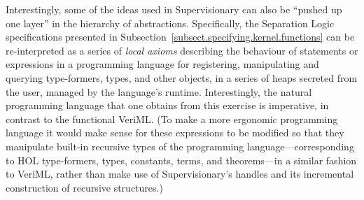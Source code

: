 \documentclass[a4paper, UKenglish, cleveref, autoref, thm-restate, colorlinks]{lipics-v2021}
\begin{document}
Interestingly, some of the ideas used in Supervisionary can also be ``pushed up one layer'' in the hierarchy of abstractions.
Specifically, the Separation Logic specifications presented in Subsection~\ref{subsect.specifying.kernel.functions} can be re-interpreted as a series of \emph{local axioms} describing the behaviour of statements or expressions in a programming language for registering, manipulating and querying type-formers, types, and other objects, in a series of heaps secreted from the user, managed by the language's runtime.
Interestingly, the natural programming language that one obtains from this exercise is imperative, in contrast to the functional VeriML.
(To make a more ergonomic programming language it would make sense for these expressions to be modified so that they manipulate built-in recursive types of the programming language---corresponding to HOL type-formers, types, constants, terms, and theorems---in a similar fashion to VeriML, rather than make use of Supervisionary's handles and its incremental construction of recursive structures.)
\end{document}

